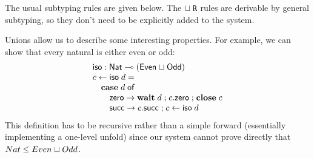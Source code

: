 \documentclass[submission,copyright,creativecommons]{eptcs}
\renewcommand{\union}{\mathrel{\sqcup}}
\newcommand{\m}[1]{\mathsf{#1}}
\newcommand{\mb}[1]{\mbox{\bf #1}}
\newcommand{\semi}{\mathrel{;}}
\begin{document}
The usual subtyping rules are given below. The $\union\Right$ rules are derivable by general subtyping, so they don't need to be explicitly added to the system.


Unions allow us to describe some interesting properties. For example, we can show that every natural is either even or odd:
\[
\begin{array}{l}
\m{iso} : \m{Nat} \lolli (\m{Even} \union \m{Odd}) \\
c \leftarrow \m{iso}\; d = \\
\quad \mb{case}\; d\; \m{of} \\
\qquad \m{zero} \rightarrow \mb{wait}\; d \semi c.\m{zero} \semi \mb{close}\; c \\
\qquad \m{succ} \rightarrow c.\m{succ} \semi c \leftarrow \m{iso}\; d
\end{array}
\]
This definition has to be recursive rather than a simple forward (essentially implementing a one-level unfold) since our system cannot prove directly that $Nat \sub Even \union Odd$.
\end{document}
